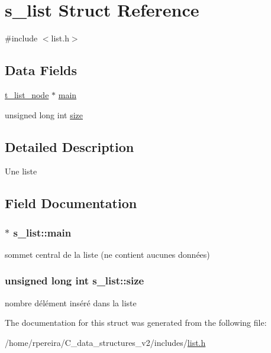 \hypertarget{structs__list}{}\section{s\+\_\+list Struct Reference}
\label{structs__list}


{\ttfamily \#include $<$list.\+h$>$}

\subsection*{Data Fields}
\begin{DoxyCompactItemize}
\item 
\hyperlink{structs__list__node}{t\+\_\+list\+\_\+node} $\ast$ \hyperlink{structs__list_a0db66d7806c2c37140b726b181003618}{main}
\item 
unsigned long int \hyperlink{structs__list_a47705c299df8f5d89cd04f1dcf51eba2}{size}
\end{DoxyCompactItemize}


\subsection{Detailed Description}
Une liste 

\subsection{Field Documentation}
\subsubsection[{\texorpdfstring{main}{main}}]{$\ast$ s\+\_\+list\+::main}\hypertarget{structs__list_a0db66d7806c2c37140b726b181003618}{}\label{structs__list_a0db66d7806c2c37140b726b181003618}
sommet central de la liste (ne contient aucunes données) 
\subsubsection[{\texorpdfstring{size}{size}}]{\setlength{\rightskip}{0pt plus 5cm}unsigned long int s\+\_\+list\+::size}\hypertarget{structs__list_a47705c299df8f5d89cd04f1dcf51eba2}{}\label{structs__list_a47705c299df8f5d89cd04f1dcf51eba2}
nombre d\textquotesingle{}élément inséré dans la liste 

The documentation for this struct was generated from the following file\+:\begin{DoxyCompactItemize}
\item 
/home/rpereira/\+C\+\_\+data\+\_\+structures\+\_\+v2/includes/\hyperlink{list_8h}{list.\+h}\end{DoxyCompactItemize}
